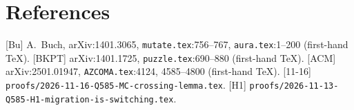 \documentclass[11pt]{article}
\theoremstyle{definition}
\begin{document}
\section*{References}
{[Bu]} A.~Buch, arXiv:1401.3065, \texttt{mutate.tex}:756--767, \texttt{aura.tex}:1--200 (first-hand TeX).
{[BKPT]} arXiv:1401.1725, \texttt{puzzle.tex}:690--880 (first-hand TeX).
{[ACM]} arXiv:2501.01947, \texttt{AZCOMA.tex}:4124, 4585--4800 (first-hand TeX).
{[11-16]} \texttt{proofs/2026-11-16-Q585-MC-crossing-lemma.tex}. {[H1]} \texttt{proofs/2026-11-13-Q585-H1-migration-is-switching.tex}.
\end{document}
